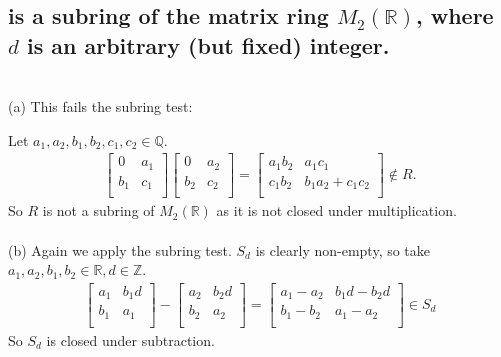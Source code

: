 \documentclass{article}
\begin{document}
\subsection*{is a subring of the matrix ring \(M_2(\mathds{R})\), where \(d\) is an arbitrary (but fixed) integer.}
\solution
\\(a) This fails the subring test:

Let \(a_1, a_2, b_1, b_2, c_1, c_2 \in \mathds{Q}\).
\begin{align*}
	\left[ {\begin{array}{cc}
   0 & a_1 \\
   b_1 & c_1 \\
  \end{array} } \right]
  \left[ {\begin{array}{cc}
   0 & a_2 \\
   b_2 & c_2 \\
  \end{array} } \right] = 
  \left[ {\begin{array}{cc}
   a_1 b_2 & a_1 c_1 \\
   c_1 b_2 & b_1 a_2 + c_1 c_2 \\
  \end{array} } \right] \notin R.
\end{align*}
So \(R\) is not a subring of \(M_2(\mathds{R})\) as it is not closed under multiplication.
\\\\
(b) Again we apply the subring test. \(S_d\) is clearly non-empty, so take \(a_1, a_2, b_1, b_2 \in \mathds{R}, d \in \mathds{Z}\).
\begin{align*}
	\left[ {\begin{array}{cc}
   a_1 & b_1 d \\
   b_1 & a_1 \\
  \end{array} } \right] - 
  \left[ {\begin{array}{cc}
   a_2 & b_2 d \\
   b_2 & a_2 \\
  \end{array} } \right] = 
  \left[ {\begin{array}{cc}
   a_1 - a_2 & b_1 d - b_2 d \\
   b_1 - b_2 & a_1 - a_2 \\
  \end{array} } \right] \in S_d
\end{align*}
So \(S_d\) is closed under subtraction.
\end{document}
